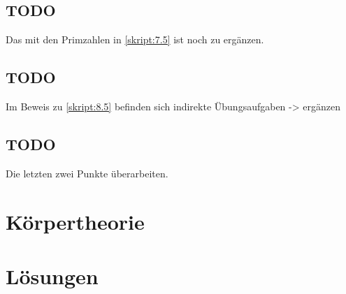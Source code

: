 \documentclass[11pt,a4paper]{scrreprt}
\theoremstyle{definition}
\theoremstyle{exercise}
\begin{document}
\setcounter{section}{6}
\section*{TODO}
Das mit den Primzahlen in \ref{skript:7.5} ist noch zu ergänzen.


\newpage
\section*{TODO}
Im Beweis zu \ref{skript:8.5} befinden sich indirekte Übungsaufgaben -> ergänzen



\newpage
\section*{TODO}
Die letzten zwei Punkte überarbeiten.



\newpage



\newpage



\newpage


\chapter{Körpertheorie}
\setcounter{section}{12}



\newpage


\newpage


\chapter{Lösungen}

\newpage

\newpage

\newpage

\newpage

\newpage

\newpage

\newpage

\newpage

\newpage

\newpage

\newpage

\newpage

\printindex
\end{document}
